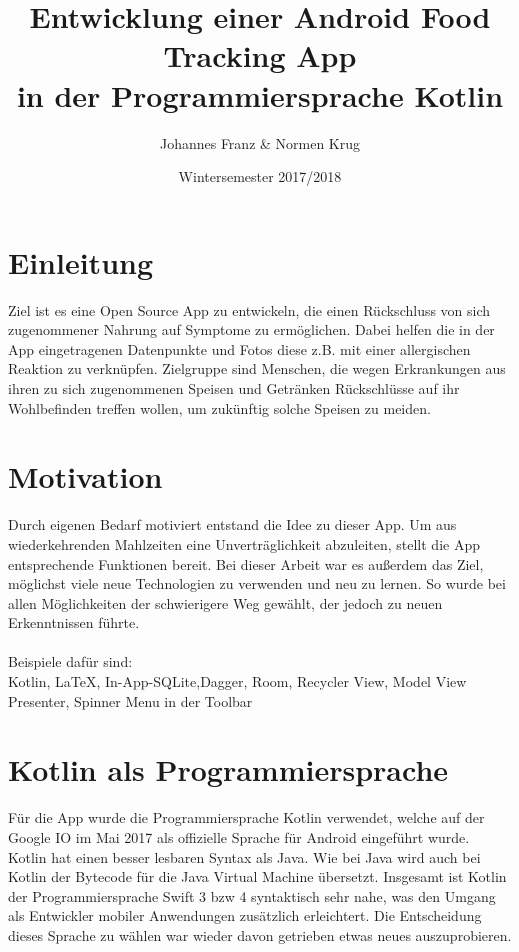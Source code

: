 \documentclass[
    DIV12,
    cleardouble=plain,
    headings=normal,
    pdftex,
    headexclude,footexclude,
    final
]{scrreprt}
\title{
  Entwicklung einer Android Food Tracking App \\[1em]
  in der Programmiersprache Kotlin  
}
\author{Johannes Franz \& Normen Krug}
\date{Wintersemester 2017/2018}
\begin{document}
\maketitle



\tableofcontents


\newpage
{}


\chapter{Einleitung}
Ziel ist es eine Open Source App zu entwickeln, die einen Rückschluss von sich zugenommener Nahrung auf Symptome zu ermöglichen. Dabei helfen die in der App eingetragenen Datenpunkte und Fotos diese z.B. mit einer allergischen Reaktion zu verknüpfen.
Zielgruppe sind Menschen, die wegen Erkrankungen aus ihren zu sich zugenommenen Speisen und Getränken Rückschlüsse auf ihr Wohlbefinden treffen wollen, um zukünftig solche Speisen zu meiden.


\chapter{Motivation}
Durch eigenen Bedarf motiviert entstand die Idee zu dieser App. Um aus wiederkehrenden Mahlzeiten eine Unverträglichkeit abzuleiten, stellt die App entsprechende Funktionen bereit.
Bei dieser Arbeit war es außerdem das Ziel, möglichst viele neue Technologien zu verwenden und neu zu lernen. So wurde bei allen Möglichkeiten der schwierigere Weg gewählt, der jedoch zu neuen Erkenntnissen führte.\\ 
\\
Beispiele dafür sind:\\
Kotlin, LaTeX, In-App-SQLite,Dagger, Room, Recycler View, Model View Presenter, Spinner Menu in der Toolbar

\newpage

\chapter{Kotlin als Programmiersprache}
Für die App wurde die Programmiersprache Kotlin verwendet, welche auf der Google IO im Mai 2017 als offizielle Sprache für Android eingeführt wurde. Kotlin hat einen besser lesbaren Syntax als Java. Wie bei Java wird auch bei Kotlin der Bytecode für die Java Virtual Machine übersetzt. Insgesamt ist Kotlin der Programmiersprache Swift 3 bzw 4 syntaktisch sehr nahe, was den Umgang als Entwickler mobiler Anwendungen zusätzlich erleichtert. Die Entscheidung dieses Sprache zu wählen war wieder davon getrieben etwas neues auszuprobieren.\\
\end{document}
